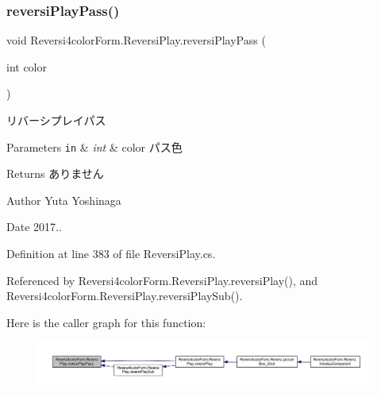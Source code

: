 \subsubsection{\texorpdfstring{reversi\+Play\+Pass()}{reversiPlayPass()}}
{\footnotesize\ttfamily void Reversi4color\+Form.\+Reversi\+Play.\+reversi\+Play\+Pass (\begin{DoxyParamCaption}\item[{int}]{color }\end{DoxyParamCaption})}



リバーシプレイパス 


\begin{DoxyParams}[1]{Parameters}
\mbox{\tt in}  & {\em int} & color パス色 \\
\hline
\end{DoxyParams}
\begin{DoxyReturn}{Returns}
ありません 
\end{DoxyReturn}
\begin{DoxyAuthor}{Author}
Yuta Yoshinaga 
\end{DoxyAuthor}
\begin{DoxyDate}{Date}
2017.. 
\end{DoxyDate}


Definition at line 383 of file Reversi\+Play.\+cs.



Referenced by Reversi4color\+Form.\+Reversi\+Play.\+reversi\+Play(), and Reversi4color\+Form.\+Reversi\+Play.\+reversi\+Play\+Sub().

Here is the caller graph for this function\+:\nopagebreak
\begin{figure}[H]
\begin{center}
\leavevmode
\includegraphics[width=350pt]{class_reversi4color_form_1_1_reversi_play_a47c3f277e5f480d6a5af1ca7b3a667f4_icgraph}
\end{center}
\end{figure}
\mbox{\label{class_reversi4color_form_1_1_reversi_play_a92b619d3fb9e1fbbb36b6b60f6dee422}} 
